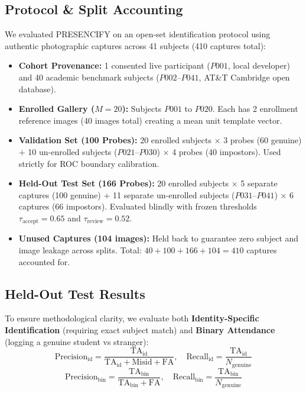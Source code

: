\documentclass[conference]{IEEEtran}
\begin{document}
\subsection{Protocol \& Split Accounting}
We evaluated PRESENCIFY on an open-set identification protocol using authentic photographic captures across 41 subjects (410 captures total):
\begin{itemize}
    \item \textbf{Cohort Provenance:} 1 consented live participant ($P001$, local developer) and 40 academic benchmark subjects ($P002$--$P041$, AT\&T Cambridge open database).
    \item \textbf{Enrolled Gallery ($M = 20$):} Subjects $P001$ to $P020$. Each has 2 enrollment reference images (40 images total) creating a mean unit template vector.
    \item \textbf{Validation Set (100 Probes):} 20 enrolled subjects $\times$ 3 probes (60 genuine) $+$ 10 un-enrolled subjects ($P021$--$P030$) $\times$ 4 probes (40 impostors). Used strictly for ROC boundary calibration.
    \item \textbf{Held-Out Test Set (166 Probes):} 20 enrolled subjects $\times$ 5 separate captures (100 genuine) $+$ 11 separate un-enrolled subjects ($P031$--$P041$) $\times$ 6 captures (66 impostors). Evaluated blindly with frozen thresholds $\tau_{\text{accept}} = 0.65$ and $\tau_{\text{review}} = 0.52$.
    \item \textbf{Unused Captures (104 images):} Held back to guarantee zero subject and image leakage across splits. Total: $40 + 100 + 166 + 104 = 410$ captures accounted for.
\end{itemize}

\subsection{Held-Out Test Results}
To ensure methodological clarity, we evaluate both \textbf{Identity-Specific Identification} (requiring exact subject match) and \textbf{Binary Attendance} (logging a genuine student vs stranger):
\begin{equation}
\text{Precision}_{\text{id}} = \frac{\text{TA}_{\text{id}}}{\text{TA}_{\text{id}} + \text{Misid} + \text{FA}}, \quad \text{Recall}_{\text{id}} = \frac{\text{TA}_{\text{id}}}{N_{\text{genuine}}}
\end{equation}
\begin{equation}
\text{Precision}_{\text{bin}} = \frac{\text{TA}_{\text{bin}}}{\text{TA}_{\text{bin}} + \text{FA}}, \quad \text{Recall}_{\text{bin}} = \frac{\text{TA}_{\text{bin}}}{N_{\text{genuine}}}
\end{equation}
\end{document}
